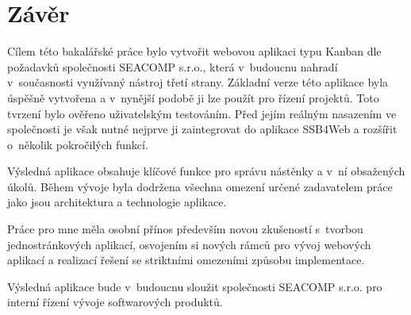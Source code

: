 \chapter{Závěr}
Cílem této bakalářské práce bylo vytvořit webovou aplikaci typu Kanban dle požadavků společnosti SEACOMP s.r.o., která v~budoucnu nahradí v~současnosti využívaný nástroj třetí strany. Základní verze této aplikace byla úspěšně vytvořena a v~nynější podobě ji lze použít pro řízení projektů. Toto tvrzení bylo ověřeno uživatelským testováním. Před jejím reálným nasazením ve společnosti je však nutné nejprve ji zaintegrovat do aplikace SSB4Web a rozšířit o~několik pokročilých funkcí.

Výsledná aplikace obsahuje klíčové funkce pro správu nástěnky a v~ní obsažených úkolů. Během vývoje byla dodržena všechna omezení určené zadavatelem práce jako jsou architektura a technologie aplikace.

Práce pro mne měla osobní přínos především novou zkušeností s~tvorbou jednostránkových aplikací, osvojením si nových rámců pro vývoj webových aplikací a realizací řešení se striktními omezeními způsobu implementace.

Výsledná aplikace bude v~budoucnu sloužit společnosti SEACOMP s.r.o. pro interní řízení vývoje softwarových produktů.
